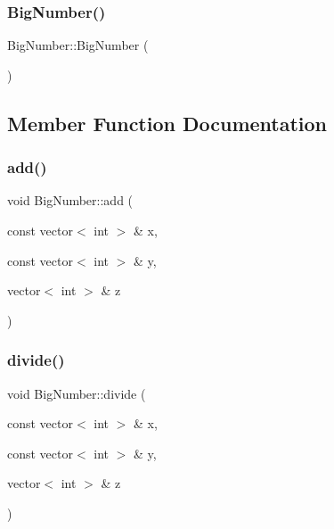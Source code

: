 \mbox{\label{class_big_number_a0d12fbec476322042ba36e61e1b0db82}} 
\subsubsection{\texorpdfstring{Big\+Number()}{BigNumber()}\hspace{0.1cm}{\footnotesize\ttfamily [2/2]}}
{\footnotesize\ttfamily Big\+Number\+::\+Big\+Number (\begin{DoxyParamCaption}{ }\end{DoxyParamCaption})}



\subsection{Member Function Documentation}
\mbox{\label{class_big_number_a106884b978df72a2efed8dd0998ea4f7}} 
\subsubsection{\texorpdfstring{add()}{add()}}
{\footnotesize\ttfamily void Big\+Number\+::add (\begin{DoxyParamCaption}\item[{const vector$<$ int $>$ \&}]{x,  }\item[{const vector$<$ int $>$ \&}]{y,  }\item[{vector$<$ int $>$ \&}]{z }\end{DoxyParamCaption})\hspace{0.3cm}{\ttfamily [private]}}

\mbox{\label{class_big_number_ae69ae04694d805916f92ebf9dae3f49b}} 
\subsubsection{\texorpdfstring{divide()}{divide()}}
{\footnotesize\ttfamily void Big\+Number\+::divide (\begin{DoxyParamCaption}\item[{const vector$<$ int $>$ \&}]{x,  }\item[{const vector$<$ int $>$ \&}]{y,  }\item[{vector$<$ int $>$ \&}]{z }\end{DoxyParamCaption})\hspace{0.3cm}{\ttfamily [private]}}

